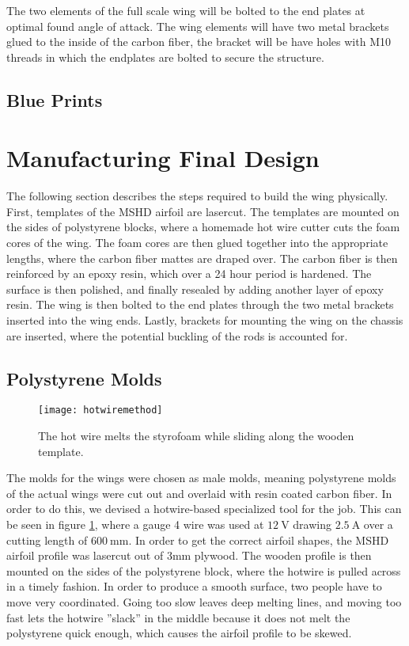   The two elements of the full scale wing will be bolted to the end plates at optimal found angle of attack. The wing elements will have two metal brackets glued to the inside of the carbon fiber, the bracket will be have holes with M10 threads in which the endplates are bolted to secure the structure.

  \subsection{Blue Prints}

\section{Manufacturing Final Design}

  The following section describes the steps required to build the wing physically. First, templates of the MSHD airfoil are lasercut. The templates are mounted on the sides of polystyrene blocks, where a homemade hot wire cutter cuts the foam cores of the wing. The foam cores are then glued together into the appropriate lengths, where the carbon fiber mattes are draped over. The carbon fiber is then reinforced by an epoxy resin, which over a 24 hour period is hardened. The surface is then polished, and finally resealed by adding another layer of epoxy resin. The wing is then bolted to the end plates through the two metal brackets inserted into the wing ends. Lastly, brackets for mounting the wing on the chassis are inserted, where the potential buckling of the rods is accounted for.

  \subsection{Polystyrene Molds}

  \begin{figure}
    \texttt{[image: hotwiremethod]}
    \caption{The hot wire melts the styrofoam while sliding along the wooden template.}
    \label{fig:hotwire}
  \end{figure}

  The molds for the wings were chosen as male molds, meaning polystyrene molds of the actual wings were cut out and overlaid with resin coated carbon fiber. In order to do this, we devised a hotwire-based specialized tool for the job. This can be seen in figure \ref{fig:hotwire}, where a gauge 4 wire was used at $\SI{12}{\volt}$ drawing $\SI{2.5}{\ampere}$ over a cutting length of $\SI{600}{\milli\metre}$. In order to get the correct airfoil shapes, the MSHD airfoil profile was lasercut out of 3mm plywood. The wooden profile is then mounted on the sides of the polystyrene block, where the hotwire is pulled across in a timely fashion. In order to produce a smooth surface, two people have to move very coordinated. Going too slow leaves deep melting lines, and moving too fast lets the hotwire ''slack'' in the middle because it does not melt the polystyrene quick enough, which causes the airfoil profile to be skewed.

